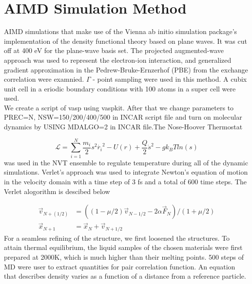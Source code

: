 \documentclass[12pt, letterpaper]{article}
\begin{document}
    \section*{AIMD Simulation Method}
    AIMD simulations that make use of the Vienna ab initio simulation package's implementation of the density functional theory based on plane waves. It was cut 
    off at 400 eV for the plane-wave basis set. The projected augmented-wave approach was used to represent the electron-ion interaction, and generalized gradient approximation
    in the Pedrew-Bruke-Ernzerhof (PBE) from the exchange correlation were examnied. $\Gamma$ - point
    sampling were used in this method. A cubix unit cell in a eriodic boundary conditions with 100 atoms in a super cell were used. \\ 

    

    We create a script of vasp using vaspkit. After that we change parameters to PREC=N, NSW=150/200/400/500 in INCAR script file and turn on molecular 
    dynamics by USING MDALGO=2 in INCAR file.The Nose-Hoover Thermostat

    \begin{equation}
        \mathcal{L} = \sum_{i = 1}^{N} \frac{m_{i}}{2}s^{2}\dot{r_{i}}^{2} - U(r) + \frac{Q}{2}\dot{s}^{2} - gk_{B}Tln(s)   
    \end{equation}
    was used in the NVT ensemble to regulate temperature during all of the dynamic simulations. Verlet's approach was used to integrate Newton's equation of motion 
    in the velocity domain with a time step of 3 fs and a total of 600 time steps.
    The Verlet alogorithm is descibed below
    
    \begin{equation}
        \begin{split}
            \vec{v}_{N+(1/2)} &= ((1-\mu/2)\vec{v}_{N-1/2}-2\alpha \vec{F}_{N})/(1+\mu/2) \\ 
            \vec{x}_{N+1} & = \vec{x}_{N} + \vec{v}_{N+1/2}
        \end{split}
    \end{equation}
    For a seamless refining of the structure, we first loosened the structures. To 
    attain thermal equilibrium, the liquid samples of the chosen materials were first prepared at 2000K, which is much higher than their melting points. 500 steps of
    MD were user to extract quantities for pair correlation function. An equation that describes density varies as a function of a distance from a reference particle.
    
\end{document}
